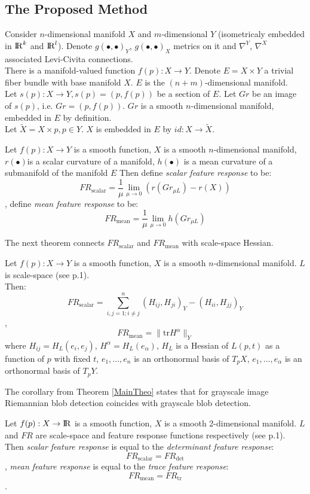 \documentclass{llncs}
\newcommand{\toreal}{\rightarrow\bbbr}
\newcommand{\CovariantDiffManif}[1]{\nabla^{#1}}
\newcommand{\TangentSpaceP}[1]{{T_p}{#1}}
\newcommand{\FRScalar}{FR_{\mathrm{scalar}}}
\newcommand{\FRMean}{FR_{\mathrm{mean}}}
\newcommand {\tr}{\mathrm{tr}}
\begin{document}
\subsection{The Proposed Method}
Consider $n$-dimensional manifold $X$ and $m$-dimensional $Y$ (isometricaly embedded in ${\rm I\!R}^k$ and ${\rm I\!R}^l$). Denote $g(∙,∙)_{Y}$, $g(∙,∙)_{X}$ metrics on it and $\CovariantDiffManif{Y}$, $\CovariantDiffManif{X}$ associated Levi-Civita connections. 
\\
There is a manifold-valued function $f(p):X\to Y$. Denote $E=X\times Y$ a  trivial fiber bundle with base manifold $X$. $E$ is the $(n+m)$-dimensional manifold. 
\\
Let $s(p):X\to Y,s(p)=(p,f(p))$ be a section of $E$. Let $Gr$ be an image of $s(p)$, i.e. $Gr=(p,f(p))$. $Gr$ is a smooth $n$-dimensional manifold, embedded in $E$ by definition.
\\
Let $\tilde{X}=X\times p, p\in Y$. $X$ is embedded in $E$ by $id:X\to\tilde{X}$.
\\
\begin{definition} \label{RiemanDef}
Let $f(p):X\to Y$ is a smooth function, $X$ is a smooth $n$-dimensional manifold, $r(∙)$is a scalar curvature of a manifold, $h(∙)$ is a mean curvature of a submanifold of the manifold $E$
Then define \emph{scalar feature response} to be:
$$\FRScalar=\frac{1}{\mu}\lim_{\mu\to 0} ( r(Gr_{\mu L} )-r(X ))$$,
define \emph{mean feature response} to be:
$$\FRMean=\frac{1}{\mu}\lim_{\mu\to 0} h(Gr_{\mu L})$$
\end{definition}
The next theorem connects $\FRScalar$ and $\FRMean$ with scale-space Hessian.
\begin{theorem} \label{MainTheo}
Let $f(p):X\to Y$ is a smooth function, $X$ is a smooth $n$-dimensional manifold. $L$ is scale-space (see p.1).\\
Then:
$$\FRScalar=\sum_{i,j=1; i\ne j}^{n}{(H_{ij},H_{ji})_Y-(H_{ii},H_{jj})_Y}$$,
$$\FRMean=\|\tr H^\alpha\|_Y$$
where $H_{ij}=H_L (e_i,e_j)$, $H^\alpha=H_L (e_\alpha)$, $H_L$ is a Hessian of $L(p,t)$ as a function of $p$ with fixed $t$, 
$e_1,\dots,e_n$ is an orthonormal basis of $\TangentSpaceP{X}$, $e_1,\dots,e_\alpha$ is an orthonormal basis of $\TangentSpaceP{Y}$.
\end{theorem}
The corollary from Theorem \ref{MainTheo} states that for grayscale image Riemannian blob detection coincides with grayscale blob detection.
\begin{corollary}\label{GrayscaleCol}
Let $f(p):X\toreal$ is a smooth function, $X$ is a smooth 2-dimensional manifold. $L$ and $FR$ are scale-space and feature response functions respectively (see p.1).\\
Then \emph{scalar feature response} is equal to the \emph{determinant feature response}:
$$\FRScalar=FR_{\det}$$,
\emph{mean feature response} is equal to the \emph{trace feature response}:
$$\FRMean=FR_{\mathrm{tr}}$$.
\end{corollary}
\end{document}
